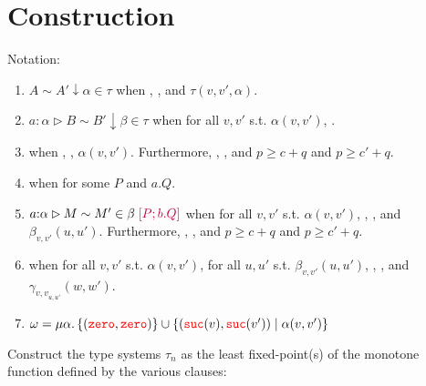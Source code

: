 
\section{Construction}

Notation:

\begin{enumerate}
  \item $A \sim A' \downarrow \alpha \in \tau$ when , , and 
  $\tau(v,v',\alpha)$.
  \item $a : \alpha \rhd B \sim B' \downarrow \beta \in \tau$ when 
  for all $v,v'$ s.t. $\alpha(v,v')$, .
\item {} when , , 
  $\alpha(v,v')$. 
    Furthermore, , , and 
    $p \ge c + q$ and $p \ge c' + q$.
  \item {} when  for some 
    $P$ and $a.Q$. 
  \item $a {:} \alpha \rhd M \sim M' \in \beta\; {\color{purple}{[P; b.Q]}}$ when 
  for all $v,v'$ s.t. $\alpha(v,v')$, 
    , , and 
    $\beta_{v,v'}(u,u')$.
    Furthermore, , , and 
    $p \ge c + q$ and $p \ge c' + q$.
\item {} when 
  for all $v,v'$ s.t. $\alpha(v,v')$, 
  for all $u,u'$ s.t. $\beta_{v,v'}(u,u')$, 
  , , and $\gamma_{{v,v}_{u,u'}}(w,w')$.
  \item $\omega = \mu \alpha.\, \{({\color{red}{\mathtt{zero}}},{\color{red}{\mathtt{zero}}})\} \cup \{({\color{red}{\mathtt{suc}}}(v),{\color{red}{\mathtt{suc}}}(v')) \mid \alpha(v,v')\}$
\end{enumerate}

Construct the type systems $\tau_n$ as the least fixed-point(s) of the 
monotone function defined by the various clauses: 

